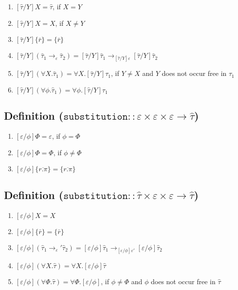 \documentclass{llncs}
\newcommand{\keywadj}[1]{\mathtt{#1}}
\newcommand{\kwa}[1]{\keywadj{ #1 }}
\begin{document}
\begin{enumerate}
	\item $[\hat \tau/Y]X = \hat \tau$, if $X = Y$
	\item $[\hat \tau/Y]X = X$, if $X \neq Y$
	\item $[\hat \tau/Y]\{ \bar r \} = \{ \bar r \}$
	\item $[\hat \tau/Y](\hat \tau_1 \rightarrow_{\varepsilon} \hat \tau_2) = [\hat \tau/Y]\hat \tau_1 \rightarrow_{[\hat \tau/Y]\varepsilon} [\hat \tau/Y]\hat \tau_2$ 
	\item $[\hat \tau/Y](\forall X. \hat \tau_1) = \forall X. [\hat \tau/Y]\tau_1$, if $Y \neq X$ and $Y$ does not occur free in $\tau_1$
	\item $[\hat \tau/Y](\forall \phi. \hat \tau_1) = \forall \phi. [\hat \tau/Y]\tau_1$
\end{enumerate}

\subsection*{Definition ($\kwa{substitution :: \varepsilon \times \varepsilon \times \varepsilon \rightarrow \hat \tau}$)}

\begin{enumerate}
	\item $[\varepsilon/\phi]\Phi = \varepsilon$, if $\phi = \Phi$
	\item $[\varepsilon/\phi]\Phi = \Phi$, if $\phi \neq \Phi$
	\item $[\varepsilon/\phi]\{ \overline{r.\pi} \} = \{ \overline{r.\pi} \}$
\end{enumerate}

\subsection*{Definition ($\kwa{substitution :: \hat \tau \times \varepsilon \times \varepsilon \rightarrow \hat \tau}$)}

\begin{enumerate}
	\item $[\varepsilon/\phi]X = X$
	\item $[\varepsilon/\phi]\{ \bar r \} = \{ \bar r \}$
	\item $[\varepsilon/\phi](\hat \tau_1 \rightarrow_\varepsilon' \hat \tau_2) = [\varepsilon/\phi]\hat \tau_1 \rightarrow_{[\varepsilon/\phi]\varepsilon'} [\varepsilon/\phi]\hat \tau_2$
	\item $[\varepsilon/\phi](\forall X. \hat \tau) = \forall X. [\varepsilon/\phi]\hat \tau$
	\item $[\varepsilon/\phi](\forall \Phi. \hat \tau) = \forall \Phi. [\varepsilon/\phi]$, if $\phi \neq \Phi$ and $\phi$ does not occur free in $\hat \tau$
\end{enumerate}
\end{document}
